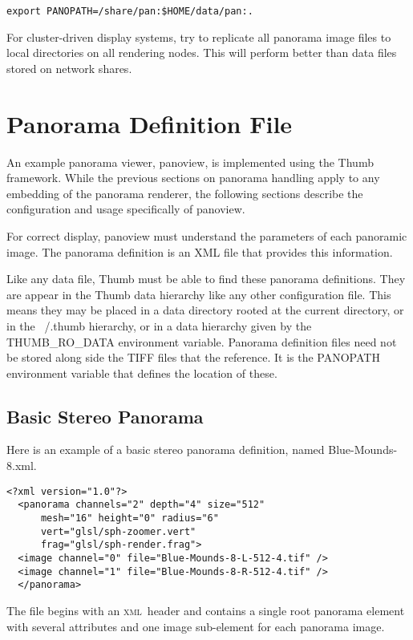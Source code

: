 \documentclass[oneside,11pt]{memoir}
\newcommand{\xml}     {\textsc{xml}}
\begin{document}
\begin{Spacing}{1.1}
\begin{verbatim}
export PANOPATH=/share/pan:$HOME/data/pan:.
\end{verbatim}

For cluster-driven display systems, try to replicate all panorama image files to local directories on all rendering nodes. This will perform better than data files stored on network shares.

\section{Panorama Definition File}

An example panorama viewer, panoview, is implemented using the Thumb framework. While the previous sections on panorama handling apply to any embedding of the panorama renderer, the following sections describe the configuration and usage specifically of panoview.

For correct display, panoview must understand the parameters of each panoramic image. The panorama definition is an XML file that provides this information.

Like any data file, Thumb must be able to find these panorama definitions. They are appear in the Thumb data hierarchy like any other configuration file. This means they may be placed in a data directory rooted at the current directory, or in the ~/.thumb hierarchy, or in a data hierarchy given by the THUMB\_RO\_DATA environment variable. Panorama definition files need not be stored along side the TIFF files that the reference. It is the PANOPATH environment variable that defines the location of these.

\subsection{Basic Stereo Panorama}

Here is an example of a basic stereo panorama definition, named Blue-Mounds-8.xml.

\begin{verbatim}
<?xml version="1.0"?>
  <panorama channels="2" depth="4" size="512"
      mesh="16" height="0" radius="6"
      vert="glsl/sph-zoomer.vert"
      frag="glsl/sph-render.frag">
  <image channel="0" file="Blue-Mounds-8-L-512-4.tif" />
  <image channel="1" file="Blue-Mounds-8-R-512-4.tif" />
  </panorama>
\end{verbatim}

The file begins with an \xml\ header and contains a single root panorama element with several attributes and one image sub-element for each panorama image.


\end{Spacing}
\end{document}
